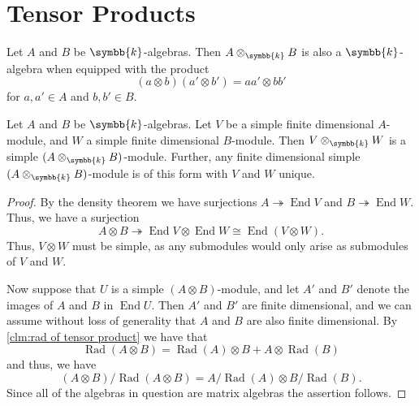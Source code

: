 \documentclass[fleqn]{NotesClass}
\renewcommand{\field}{\symbb{k}}
\DeclareMathOperator{\End}{End}
\newcommand{\isomorphic}{\cong}
\DeclareMathOperator{\Rad}{Rad}
\begin{document}
    \section{Tensor Products}
    Let \(A\) and \(B\) be \(\field\)-algebras.
    Then \(A \otimes_{\field} B\) is also a \(\field\)-algebra when equipped with the product
    \begin{equation}
        (a \otimes b)(a' \otimes b') = aa' \otimes bb'
    \end{equation}
    for \(a, a' \in A\) and \(b, b' \in B\).
    
    \begin{thm}{}{}
        Let \(A\) and \(B\) be \(\field\)-algebras.
        Let \(V\) be a simple finite dimensional \(A\)-module, and \(W\) a simple finite dimensional \(B\)-module.
        Then \(V \otimes_{\field} W\) is a simple \((A \otimes_{\field} B)\)-module.
        Further, any finite dimensional simple \((A \otimes_{\field} B)\)-module is of this form with \(V\) and \(W\) unique.
        \begin{proof}
            By the density theorem we have surjections \(A \twoheadrightarrow \End V\) and \(B \twoheadrightarrow \End W\).
            Thus, we have a surjection
            \begin{equation}
                A \otimes B \twoheadrightarrow \End V \otimes \End W \isomorphic \End(V \otimes W).
            \end{equation}
            Thus, \(V \otimes W\) must be simple, as any submodules would only arise as submodules of \(V\) and \(W\).
            
            Now suppose that \(U\) is a simple \((A \otimes B)\)-module, and let \(A'\) and \(B'\) denote the images of \(A\) and \(B\) in \(\End U\).
            Then \(A'\) and \(B'\) are finite dimensional, and we can assume without loss of generality that \(A\) and \(B\) are also finite dimensional.
            By \cref{clm:rad of tensor product} we have that
            \begin{equation}
                \Rad(A \otimes B) = \Rad(A) \otimes B + A \otimes \Rad(B)
            \end{equation}
            and thus, we have
            \begin{equation}
                (A \otimes B)/\Rad(A \otimes B) = A/\Rad(A) \otimes B/\Rad(B).
            \end{equation}
            Since all of the algebras in question are matrix algebras the assertion follows.
        \end{proof}
    \end{thm}
    
\end{document}
